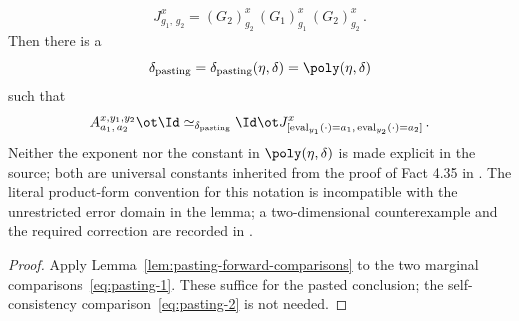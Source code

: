 \begin{lemma}
	\begin{equation}\label{eq:pasting-2a}
		J^x_{g_1,\,g_2} = (G_2)^x_{g_2}\, (G_1)^x_{g_1}\, (G_2)^x_{g_2}\,.
	\end{equation}
	Then there is a
	\begin{equation}\label{eq:def-deltap}
		\delta_{\mathrm{pasting}} = \delta_{\mathrm{pasting}}(\eta, \delta) = \poly(\eta, \delta)
	\end{equation}
	such that
	\begin{equation}\label{eq:pasting-3}
		A^{x,y_1,y_2}_{a_1,\,a_2} \ot \Id \simeq_{\delta_{\mathrm{pasting}}} \Id \ot J^x_{[\operatorname{eval}_{y_1}(\cdot)=a_1,\, \operatorname{eval}_{y_2}(\cdot)=a_2]}\,.
	\end{equation}
	Neither the exponent nor the constant in $\poly(\eta, \delta)$ is made explicit in the source; both are universal constants inherited from the proof of Fact 4.35 in \cite{Natarajan2018NEEXP}. The literal product-form convention for this notation is incompatible with the unrestricted error domain in the lemma; a two-dimensional counterexample and the required correction are recorded in \cite{gap:qpbt_pasting-product-error}.
\end{lemma}
\begin{proof}
	\leanok
	Apply Lemma~\ref{lem:pasting-forward-comparisons} to the two marginal
	comparisons~\eqref{eq:pasting-1}. These suffice for the pasted conclusion;
	the self-consistency comparison~\eqref{eq:pasting-2} is not needed.
\end{proof}

